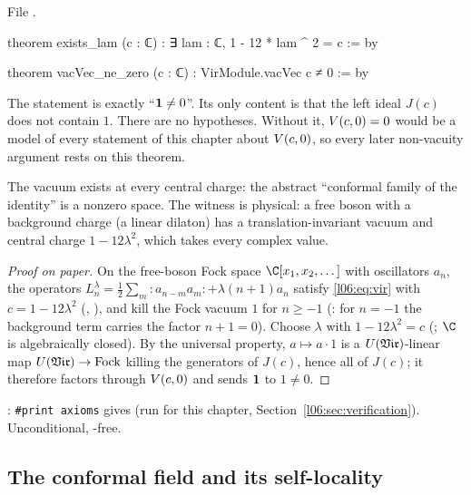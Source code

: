 File .
\begin{leancode}
theorem exists_lam (c : ℂ) : ∃ lam : ℂ, 1 - 12 * lam ^ 2 = c := by

theorem vacVec_ne_zero (c : ℂ) : VirModule.vacVec c ≠ 0 := by
\end{leancode}

\begin{dictionary}
The statement is exactly ``$\mathbf{1}\ne0$''. Its only content is that the left ideal $J(c)$ does not
contain $1$. There are no hypotheses. Without it, $V(c,0) = 0$ would be a model of every statement of
this chapter about $V(c,0)$, so every later non-vacuity argument rests on this theorem.
\end{dictionary}

\begin{physics}
The vacuum exists at every central charge: the abstract ``conformal family of the identity'' is a
nonzero space. The witness is physical: a free boson with a background charge (a linear dilaton) has
a translation-invariant vacuum and central charge $1-12\lambda^2$, which takes every complex value.
\end{physics}

\begin{proof}[Proof on paper]
On the free-boson Fock space $\C[x_1,x_2,\dots]$ with oscillators $a_n$, the operators
$L^\lambda_n = \frac12\sum_m{:}a_{n-m}a_m{:}+\lambda(n+1)a_n$ satisfy \eqref{l06:eq:vir} with
$c = 1-12\lambda^2$ (, ), and kill the Fock vacuum $1$ for
$n\ge-1$ (: for $n=-1$ the background term carries the factor $n+1 = 0$). Choose
$\lambda$ with $1-12\lambda^2 = c$ (; $\C$ is algebraically closed). By the universal
property, $a\mapsto a\cdot1$ is a $U(\mathfrak{Vir})$-linear map $U(\mathfrak{Vir})\to\mathrm{Fock}$ killing the generators of
$J(c)$, hence all of $J(c)$; it therefore factors through $V(c,0)$ and sends $\mathbf{1}$ to $1\ne0$.
\end{proof}

\begin{status}
: \texttt{\#print axioms} gives \lean{[propext, Classical.}\allowbreak{}\allowbreak\lean{sound]}
(run for this chapter, Section~\ref{l06:sec:verification}). Unconditional, -free.
\end{status}

\subsection{The conformal field and its self-locality}

